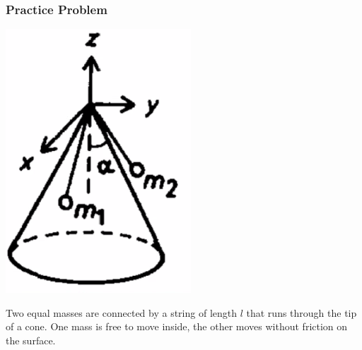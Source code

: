 \subsubsection{Practice Problem}
\begin{center}
    \includegraphics[scale=0.5]{Lecture-35/l35-img1.png}
\end{center}
Two equal masses are connected by a string of length $l$ that runs through the tip of a cone. One mass is free to move inside, the other moves without friction on the surface. 

